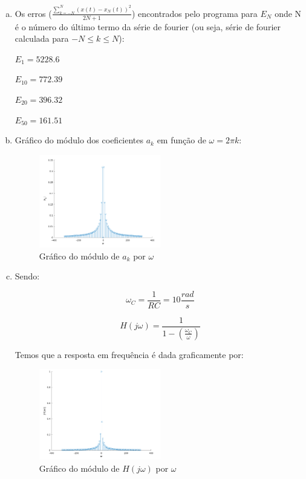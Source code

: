 \documentclass{article}
\begin{document}
\begin{enumerate}[(a)]
\item 
    Os erros ($\frac{\sum\limits _{k = -N} ^{N} (x(t) - x_N(t))^2}{2N+1}$) encontrados pelo programa para $E_N$ onde N é o número do último termo da série de fourier (ou seja, série de fourier calculada para $-N \leq k \leq N$):
\hfill\break

$E_1 = 5228.6$

$E_{10} = 772.39$

$E_{20} = 396.32$

$E_{50} = 161.51$

\break\hfill

\item

Gráfico do módulo dos coeficientes $a_k$ em função de $\omega = 2 \pi k$:

\begin{figure}[H]
\centering
\includegraphics[width=0.5\textwidth]{images/ak_x_w.png}
    \caption{Gráfico do módulo de $a_k$ por $\omega$}
\end{figure}

\item

Sendo:

\begin{equation}
    \omega_C = \frac{1}{RC} = 10 \frac{rad}{s}
\end{equation}

\begin{equation}
    H(j \omega) = \frac{1}{1 - \left ( \frac{\omega_C}{\omega} \right )}
\end{equation}

Temos que a resposta em frequência é dada graficamente por:

\begin{figure}[H]
\centering
\includegraphics[width=0.5\textwidth]{images/abs_x_w.png}
    \caption{Gráfico do módulo de $H(j\omega)$ por $\omega$}
\end{figure}


\end{enumerate}
\end{document}
